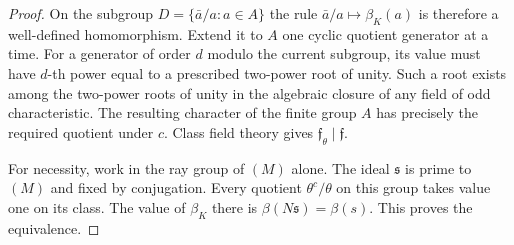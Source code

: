 \documentclass[a4paper,11pt]{article}
\theoremstyle{definition}
\theoremstyle{remark}
\numberwithin{equation}{section}
\begin{document}
\begin{proof}
On the subgroup \(D=\{\bar a/a:a\in A\}\) the rule
\(\bar a/a\mapsto\beta_K(a)\) is therefore a well-defined
homomorphism. Extend it to \(A\) one cyclic quotient generator
at a time. For a generator of order \(d\) modulo the current
subgroup, its value must have \(d\)-th power equal to a prescribed
two-power root of unity. Such a root exists among the two-power
roots of unity in the algebraic closure of any field of odd
characteristic. The resulting character of the finite group
\(A\) has precisely the required quotient under \(c\).
Class field theory gives \(\mathfrak f_\theta\mid\mathfrak f\).

For necessity, work in the ray group of \((M)\) alone. The ideal
\(\mathfrak s\) is prime to \((M)\) and fixed by conjugation.
Every quotient \(\theta^c/\theta\) on this group takes value
one on its class. The value of \(\beta_K\) there is
\(\beta(N\mathfrak s)=\beta(s)\). This proves the equivalence.
\end{proof}
\end{document}
